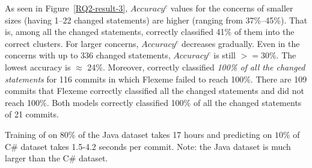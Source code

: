 
	

\vspace{2pt}
 As seen in
Figure~\ref{RQ2-result-3}, $Accuracy^{c}$ values for the concerns of
smaller sizes (having 1--22 changed statements) are higher (ranging
from 37\%--45\%). That is, among all the changed statements, {\tool}
correctly classified 41\% of them into the correct clusters. 
For larger concerns, $Accuracy^{c}$ decreases gradually. Even in
the concerns with up to 336 changed statements, $Accuracy^{c}$ is
still $>=$30\%. The lowest accuracy is $\approx$ 24\%.  Moreover,
{\tool} correctly classified {\em 100\% of all the changed statements}
for 116 commits in which Flexeme failed to reach 100\%. There are 109
commits that Flexeme correctly classified all the changed statements
and {\tool} did not reach 100\%. Both models correctly classified
100\% of all the changed statements of 21 commits.


Training of \tool on $80\%$ of the Java dataset takes 17 hours and
predicting on $10\%$ of C\# dataset takes 1.5-4.2 seconds per commit.
Note: the Java dataset is much larger than the C\# dataset.
